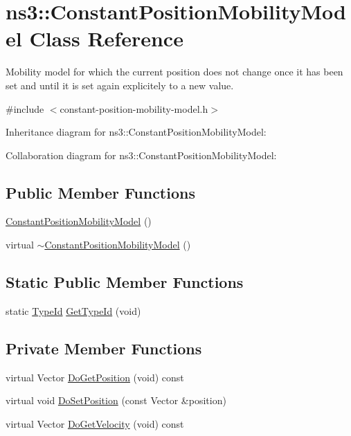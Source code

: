 \hypertarget{classns3_1_1ConstantPositionMobilityModel}{}\section{ns3\+:\+:Constant\+Position\+Mobility\+Model Class Reference}
\label{classns3_1_1ConstantPositionMobilityModel}


Mobility model for which the current position does not change once it has been set and until it is set again explicitely to a new value.  




{\ttfamily \#include $<$constant-\/position-\/mobility-\/model.\+h$>$}



Inheritance diagram for ns3\+:\+:Constant\+Position\+Mobility\+Model\+:


Collaboration diagram for ns3\+:\+:Constant\+Position\+Mobility\+Model\+:
\subsection*{Public Member Functions}
\begin{DoxyCompactItemize}
\item 
\hyperlink{classns3_1_1ConstantPositionMobilityModel_aa276204f623163aac7d6f11bf298a6e9}{Constant\+Position\+Mobility\+Model} ()
\item 
virtual \hyperlink{classns3_1_1ConstantPositionMobilityModel_ae351e8b48f141f085ca396d94043520c}{$\sim$\+Constant\+Position\+Mobility\+Model} ()
\end{DoxyCompactItemize}
\subsection*{Static Public Member Functions}
\begin{DoxyCompactItemize}
\item 
static \hyperlink{classns3_1_1TypeId}{Type\+Id} \hyperlink{classns3_1_1ConstantPositionMobilityModel_a3faba73644f27b72acf61fc266b5796d}{Get\+Type\+Id} (void)
\end{DoxyCompactItemize}
\subsection*{Private Member Functions}
\begin{DoxyCompactItemize}
\item 
virtual Vector \hyperlink{classns3_1_1ConstantPositionMobilityModel_a31f6cd79edbcec040a5f7bab653e69ff}{Do\+Get\+Position} (void) const 
\item 
virtual void \hyperlink{classns3_1_1ConstantPositionMobilityModel_a007b201f24d740f741cd464b212259bf}{Do\+Set\+Position} (const Vector \&position)
\item 
virtual Vector \hyperlink{classns3_1_1ConstantPositionMobilityModel_aec050cba38f004ce8fcd5e5bd1b46259}{Do\+Get\+Velocity} (void) const 
\end{DoxyCompactItemize}
